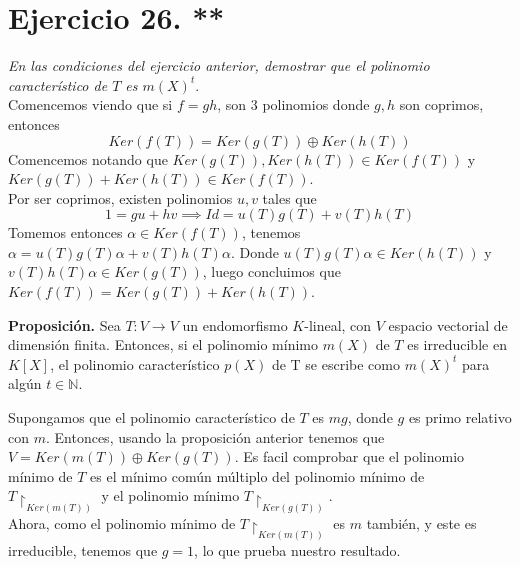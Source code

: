 \section{Ejercicio 26. **} \textit{En las condiciones del ejercicio anterior,
  demostrar que el polinomio característico de \(T\) es \(m(X)^t\)}.\\

Comencemos viendo que si \(f = gh\), son 3 polinomios donde \(g,h\) son
coprimos, entonces
\[
  Ker(f(T)) = Ker(g(T)) \oplus Ker(h(T))
\]
Comencemos notando que \(Ker(g(T)), Ker(h(T)) \in Ker(f(T))\) y \(Ker(g(T)) +
Ker(h(T)) \in Ker(f(T))\).\\ Por ser coprimos, existen polinomios \(u,v\) tales
que
\[
  1 = gu + hv \implies Id = u(T)g(T) + v(T)h(T)
\]
Tomemos entonces \(\alpha \in Ker(f(T))\), tenemos \(\alpha = u(T)g(T)\alpha +
v(T)h(T)\alpha\).
Donde  \( u(T)g(T)\alpha \in Ker(h(T))\) y  \( v(T)h(T)\alpha \in Ker(g(T))\),
luego concluimos que \(Ker(f(T)) = Ker(g(T)) + Ker(h(T))\).

\textbf{Proposición.} Sea \(T: V \rightarrow V \) un endomorfismo \(K\)-lineal, con \(V\) espacio vectorial de dimensión finita. Entonces, si el polinomio mínimo \(m(X)\) de  \(T\) es irreducible en  \(K[X]\), el polinomio característico \(p(X)\) de T se escribe como \(m(X)^t\) para algún \(t \in \mathbb{N}\).

Supongamos que el polinomio característico de \(T\) es  \(mg\), donde  \(g\) es primo relativo con \(m\). Entonces, usando la proposición anterior tenemos que \(V = Ker(m(T)) \oplus Ker(g(T))\). Es facil comprobar que el polinomio mínimo de \(T\) es el mínimo común múltiplo del polinomio mínimo de \(T\restriction_{Ker(m(T))}\) y el polinomio mínimo \(T\restriction_{Ker(g(T))}\).\\

Ahora, como el polinomio mínimo de \(T\restriction_{Ker(m(T))}\) es \(m\) también, y este es irreducible, tenemos que \(g = 1\), lo que prueba nuestro resultado.
